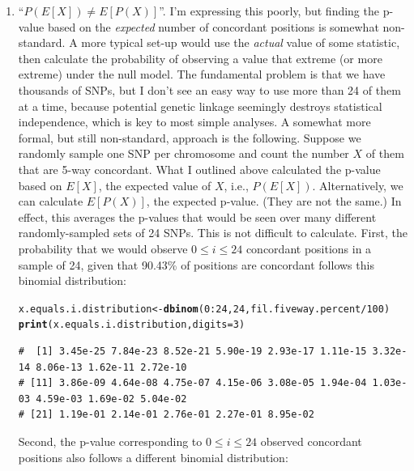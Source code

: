\documentclass{article}\usepackage[]{graphicx}\usepackage[]{color}
\makeatletter
\newcommand{\hlnum}[1]{\textcolor[rgb]{0.686,0.059,0.569}{#1}}%
\newcommand{\hlopt}[1]{\textcolor[rgb]{0,0,0}{#1}}%
\newcommand{\hlstd}[1]{\textcolor[rgb]{0.345,0.345,0.345}{#1}}%
\newcommand{\hlkwb}[1]{\textcolor[rgb]{0.69,0.353,0.396}{#1}}%
\newcommand{\hlkwc}[1]{\textcolor[rgb]{0.333,0.667,0.333}{#1}}%
\newcommand{\hlkwd}[1]{\textcolor[rgb]{0.737,0.353,0.396}{\textbf{#1}}}%
\newenvironment{kframe}{%
 \def\at@end@of@kframe{}%
 \ifinner\ifhmode%
  \def\at@end@of@kframe{\end{minipage}}%
  \begin{minipage}{\columnwidth}%
 \fi\fi%
 \def\FrameCommand##1{\hskip\@totalleftmargin \hskip-\fboxsep
 \colorbox{shadecolor}{##1}\hskip-\fboxsep
     \hskip-\linewidth \hskip-\@totalleftmargin \hskip\columnwidth}%
 \MakeFramed {\advance\hsize-\width
   \@totalleftmargin\z@ \linewidth\hsize
   \@setminipage}}%
 {\par\unskip\endMakeFramed%
 \at@end@of@kframe}
\newenvironment{knitrout}{}{} %
\makeatother
\begin{document}
\begin{enumerate}
  \item ``$P(E[X]) \neq E[P(X)]$''.  I'm expressing this poorly, but finding the p-value based on the \emph{expected} number of concordant positions is somewhat non-standard.  A more typical set-up would use the \emph{actual} value of some statistic, then calculate the probability of observing a value that extreme (or more extreme) under the null model.  The fundamental problem is that we have thousands of SNPs, but I don't see an easy way to use more than 24 of them at a time, because potential genetic linkage seemingly destroys statistical independence, which is key to most simple analyses.  
A somewhat more formal, but still non-standard, approach is the following.  Suppose we randomly sample one SNP per chromosome and count the number $X$ of them that are 5-way concordant.  What I outlined above calculated the p-value based on $E[X]$, the expected value of $X$, i.e., $P(E[X])$.  Alternatively, we can calculate $E[P(X)]$, the expected p-value.  (They are not the same.)  In effect, this averages the p-values that would be seen over many different randomly-sampled sets of 24 SNPs.  This is not difficult to calculate.  First, the probability that we would observe $0 \leq i \leq 24$ concordant positions in a sample of 24, given that 90.43\% of positions are concordant follows this binomial distribution:

\begin{knitrout}\footnotesize
{}\color{fgcolor}\begin{kframe}
\begin{alltt}
\hlstd{x.equals.i.distribution} \hlkwb{<-} \hlkwd{dbinom}\hlstd{(}\hlnum{0}\hlopt{:}\hlnum{24}\hlstd{,} \hlnum{24}\hlstd{, fil.fiveway.percent}\hlopt{/}\hlnum{100}\hlstd{)}
\hlkwd{print}\hlstd{(x.equals.i.distribution,} \hlkwc{digits}\hlstd{=}\hlnum{3}\hlstd{)}
\end{alltt}
\begin{verbatim}
#  [1] 3.45e-25 7.84e-23 8.52e-21 5.90e-19 2.93e-17 1.11e-15 3.32e-14 8.06e-13 1.62e-11 2.72e-10
# [11] 3.86e-09 4.64e-08 4.75e-07 4.15e-06 3.08e-05 1.94e-04 1.03e-03 4.59e-03 1.69e-02 5.04e-02
# [21] 1.19e-01 2.14e-01 2.76e-01 2.27e-01 8.95e-02
\end{verbatim}
\end{kframe}
\end{knitrout}

Second, the p-value corresponding to $0 \leq i \leq 24$ observed concordant positions also follows a different binomial distribution:


\end{enumerate}
\end{document}
